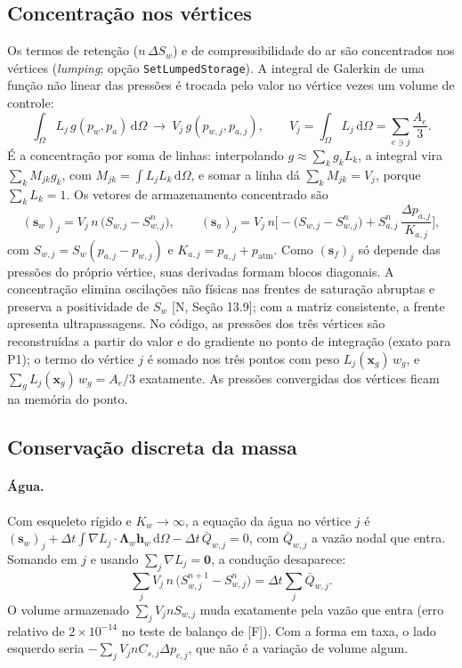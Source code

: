 \documentclass[11pt,a4paper]{article}
\newcommand{\patm}{p_{\mathrm{atm}}}
\newcommand{\dd}{\mathrm d}
\begin{document}
\subsection{Concentração nos vértices}
Os termos de retenção ($n\,\Delta S_w$) e de compressibilidade do ar são concentrados nos
vértices (\emph{lumping}; opção \texttt{SetLumpedStorage}). A integral de Galerkin de uma
função não linear das pressões é trocada pelo valor no vértice vezes um volume de controle:
\begin{equation}
\int_\Omega L_j\,g(p_w,p_a)\,\dd\Omega\ \longrightarrow\ V_j\,g(p_{w,j},p_{a,j}),\qquad
V_j=\int_\Omega L_j\,\dd\Omega=\sum_{e\ni j}\frac{A_e}{3}.
\label{eq:lumping}
\end{equation}
É a concentração por soma de linhas: interpolando $g\approx\sum_kg_kL_k$, a integral vira
$\sum_kM_{jk}g_k$, com $M_{jk}=\int L_jL_k\,\dd\Omega$, e somar a linha dá
$\sum_kM_{jk}=V_j$, porque $\sum_kL_k=1$. Os vetores de armazenamento concentrado são
\begin{equation}
(\mathbf s_w)_j=V_j\,n\,\big(S_{w,j}-S_{w,j}^{n}\big),\qquad
(\mathbf s_a)_j=V_j\,n\Big[-\big(S_{w,j}-S_{w,j}^{n}\big)
+S_{a,j}^{n}\,\frac{\Delta p_{a,j}}{K_{a,j}}\Big],
\label{eq:svec}
\end{equation}
com $S_{w,j}=S_w(p_{a,j}-p_{w,j})$ e $K_{a,j}=p_{a,j}+\patm$. Como $(\mathbf s_f)_j$ só
depende das pressões do próprio vértice, suas derivadas formam blocos diagonais. A
concentração elimina oscilações não físicas nas frentes de saturação abruptas e preserva a
positividade de $S_w$ [N, Seção 13.9]; com a matriz consistente, a frente apresenta
ultrapassagens. No código, as pressões dos três vértices são reconstruídas a partir do valor
e do gradiente no ponto de integração (exato para P1); o termo do vértice $j$ é somado nos
três pontos com peso $L_j(\bm x_g)\,w_g$, e $\sum_gL_j(\bm x_g)\,w_g=A_e/3$ exatamente. As
pressões convergidas dos vértices ficam na memória do ponto.

\subsection{Conservação discreta da massa}
\label{sec:conservacao}
\paragraph{Água.} Com esqueleto rígido e $K_w\to\infty$, a equação da água no vértice $j$ é
$(\mathbf s_w)_j+\Delta t\int\nabla L_j\cdot\bm\Lambda_w\bm h_w\,\dd\Omega
-\Delta t\,\bar Q_{w,j}=0$, com $\bar Q_{w,j}$ a vazão nodal que entra. Somando em $j$ e
usando $\sum_j\nabla L_j=\bm 0$, a condução desaparece:
\begin{equation}
\sum_jV_j\,n\,\big(S_{w,j}^{n+1}-S_{w,j}^{n}\big)=\Delta t\sum_j\bar Q_{w,j}.
\label{eq:conserva_w}
\end{equation}
O volume armazenado $\sum_jV_jnS_{w,j}$ muda exatamente pela vazão que entra (erro relativo
de $2\times10^{-14}$ no teste de balanço de [F]). Com a forma em taxa, o lado esquerdo seria
$-\sum_jV_jnC_{s,j}\Delta p_{c,j}$, que não é a variação de volume algum.
\end{document}
